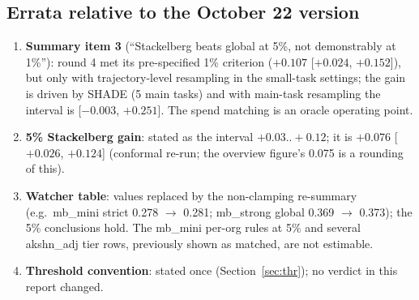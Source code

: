 \documentclass[11pt]{article}
\begin{document}
\subsection{Errata relative to the October 22 version}
\begin{enumerate}
\item \textbf{Summary item 3} (``Stackelberg beats global at 5\%, not demonstrably at 1\%''): round 4 met its pre-specified 1\% criterion ($+0.107$ [$+0.024$, $+0.152$]), but only with trajectory-level resampling in the small-task settings; the gain is driven by SHADE (5 main tasks) and with main-task resampling the interval is [$-0.003$, $+0.251$]. The spend matching is an oracle operating point.
\item \textbf{5\% Stackelberg gain}: stated as the interval $+0.03..+0.12$; it is $+0.076$ [$+0.026$, $+0.124$] (conformal re-run; the overview figure's 0.075 is a rounding of this).
\item \textbf{Watcher table}: values replaced by the non-clamping re-summary (e.g.\ mb\_mini strict 0.278 $\to$ 0.281; mb\_strong global 0.369 $\to$ 0.373); the 5\% conclusions hold. The mb\_mini per-org rules at 5\% and several akshn\_adj tier rows, previously shown as matched, are not estimable.
\item \textbf{Threshold convention}: stated once (Section~\ref{sec:thr}); no verdict in this report changed.
\end{enumerate}
\end{document}
